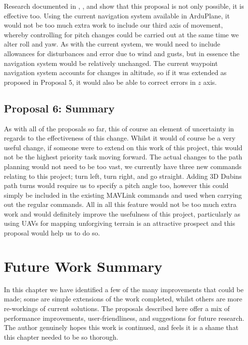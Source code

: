 Research documented in \cite{beard2013implementing}, \cite{hota2010optimal}, and \cite{lin2014path} show that this proposal is not only possible, it is effective too. Using the current navigation system available in ArduPlane, it would not be too much extra work to include our third axis of movement, whereby controlling for pitch changes could be carried out at the same time we alter roll and yaw. As with the current system, we would need to include allowances for disturbances and error due to wind and gusts, but in essence the navigation system would be relatively unchanged. The current waypoint navigation system accounts for changes in altitude, so if it was extended as proposed in Proposal 5, it would also be able to correct errors in $z$ axis. 

\subsection{Proposal 6: Summary} 
\label{future:3dsummary}

As with all of the proposals so far, this of course an element of uncertainty in regards to the effectiveness of this change. Whilst it would of course be a very useful change, if someone were to extend on this work of this project, this would not be the highest priority task moving forward. The actual changes to the path planning would not need to be too vast, we currently have three new commands relating to this project; turn left, turn right, and go straight. Adding 3D Dubins path turns would require us to specify a pitch angle too, however this could simply be included in the existing MAVLink commands and used when carrying out the regular commands. All in all this feature would not be too much extra work and would definitely improve the usefulness of this project, particularly as using UAVs for mapping unforgiving terrain is an attractive prospect and this proposal would help us to do so.

\section{Future Work Summary}
\label{future:summary}

In this chapter we have identified a few of the many improvements that could be made; some are simple extensions of the work completed, whilst others are more re-workings of current solutions. The proposals described here offer a mix of performance improvements, user-friendliness, and suggestions for future research. The author genuinely hopes this work is continued, and feels it is a shame that this chapter needed to be so thorough.